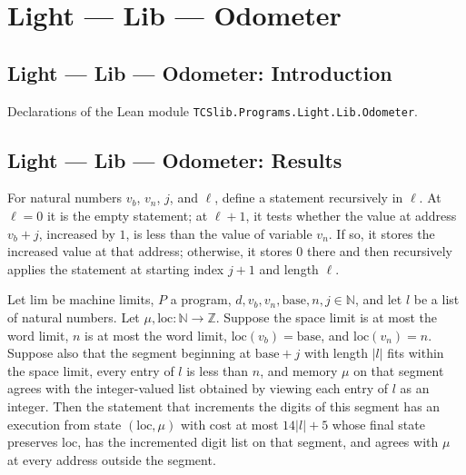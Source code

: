 \section{Light --- Lib --- Odometer}
\subsection*{Light --- Lib --- Odometer: Introduction}

Declarations of the Lean module \texttt{TCSlib.Programs.Light.Lib.Odometer}.

\subsection*{Light --- Lib --- Odometer: Results}

\begin{definition}
\label{Light.incStmt}
\leanok
{}
For natural numbers $v_b$, $v_n$, $j$, and $\ell$, define a statement recursively in $\ell$.
At $\ell=0$ it is the empty statement; at $\ell+1$, it tests whether the value at
address $v_b+j$, increased by $1$, is less than the value of variable $v_n$. If so, it
stores the increased value at that address; otherwise, it stores $0$ there and then
recursively applies the statement at starting index $j+1$ and length $\ell$.
\end{definition}

\begin{theorem}
\label{Light.incStmt_ends}
\leanok
{}
Let $\mathrm{lim}$ be machine limits, $P$ a program,
$d,v_b,v_n,\mathrm{base},n,j\in\mathbb N$, and let $l$ be a list of natural numbers. Let
$\mu,\mathrm{loc}:\mathbb N\to\mathbb Z$. Suppose the space limit is at most the word
limit, $n$ is at most the word limit, $\mathrm{loc}(v_b)=\mathrm{base}$, and
$\mathrm{loc}(v_n)=n$. Suppose also that the segment beginning at $\mathrm{base}+j$ with
length $|l|$ fits within the space limit, every entry of $l$ is less than $n$, and
memory $\mu$ on that segment agrees with the integer-valued list obtained by viewing
each entry of $l$ as an integer. Then the statement that increments the digits of this
segment has an execution from state $(\mathrm{loc},\mu)$ with cost at most $14|l|+5$
whose final state preserves $\mathrm{loc}$, has the incremented digit list on that
segment, and agrees with $\mu$ at every address outside the segment.
\end{theorem}

